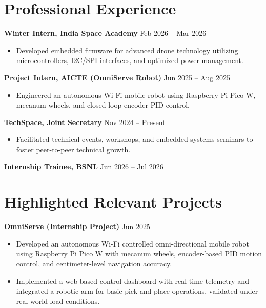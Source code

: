\documentclass[10pt,a4paper]{article}%
\begin{document}
\section*{Professional Experience}%
\noindent \textbf{Winter Intern, India Space Academy} \hfill Feb 2026 -- Mar 2026%
\begin{itemize}[leftmargin=15pt, nosep, topsep=0pt]%
\item Developed embedded firmware for advanced drone technology utilizing microcontrollers, I2C/SPI interfaces, and optimized power management.%
\end{itemize} \vspace{6pt}%

\noindent \textbf{Project Intern, AICTE (OmniServe Robot)} \hfill Jun 2025 -- Aug 2025%
\begin{itemize}[leftmargin=15pt, nosep, topsep=0pt]%
\item Engineered an autonomous Wi-Fi mobile robot using Raspberry Pi Pico W, mecanum wheels, and closed-loop encoder PID control.%
\end{itemize} \vspace{6pt}%

\noindent \textbf{TechSpace, Joint Secretary} \hfill Nov 2024 -- Present%
\begin{itemize}[leftmargin=15pt, nosep, topsep=0pt]%
\item Facilitated technical events, workshops, and embedded systems seminars to foster peer-to-peer technical growth.%
\end{itemize} \vspace{6pt}%

\noindent \textbf{Internship Trainee, BSNL} \hfill Jun 2026 -- Jul 2026 \vspace{6pt}%

\section*{Highlighted Relevant Projects}%
\noindent \textbf{OmniServe (Internship Project)} \hfill Jun 2025%
\begin{itemize}[leftmargin=15pt, nosep, topsep=0pt]%
\item Developed an autonomous Wi-Fi controlled omni-directional mobile robot using Raspberry Pi Pico W with mecanum wheels, encoder-based PID motion control, and centimeter-level navigation accuracy.%
\item Implemented a web-based control dashboard with real-time telemetry and integrated a robotic arm for basic pick-and-place operations, validated under real-world load conditions.%
\end{itemize} \vspace{8pt}
\end{document}
